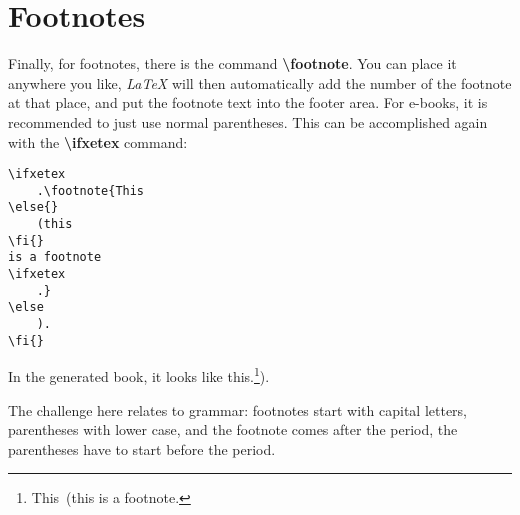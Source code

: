 \section{Footnotes}\label{c1_footnotes:sec}

Finally, for footnotes, there is the command \textbf{\textbackslash footnote}. You can place it anywhere you like, \textit{LaTeX} will then automatically add the number of the footnote at that place, and put the footnote text into the footer area. For e-books, it is recommended to just use normal parentheses. This can be accomplished again with the \textbf{\textbackslash ifxetex} command: 
\begin{lstlisting}
\ifxetex
	.\footnote{This
\else{}
	(this
\fi{} 
is a footnote
\ifxetex
	.}
\else
	).
\fi{}

\end{lstlisting}

In the generated book, it looks like this\ifxetex.\footnote{This\else~(this\fi{} is a footnote\ifxetex.}\else).\fi{} 

The challenge here relates to grammar: footnotes start with capital letters, parentheses with lower case, and the footnote comes after the period, the parentheses have to start before the period.